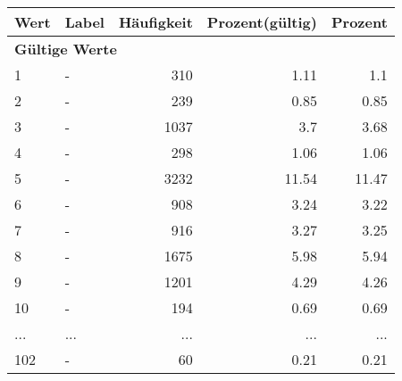      \begin{longtable}{lXrrr}
     \toprule
     \textbf{Wert} & \textbf{Label} & \textbf{Häufigkeit} & \textbf{Prozent(gültig)} & \textbf{Prozent} \\
     \endhead
     \midrule
     \multicolumn{5}{l}{\textbf{Gültige Werte}}\\
        1 & \multicolumn{1}{X}{-} & %
          \num{310} &
          \num[round-mode=places,round-precision=2]{1.11} &
          \num[round-mode=places,round-precision=2]{1.1} \\
        2 & \multicolumn{1}{X}{-} & %
          \num{239} &
          \num[round-mode=places,round-precision=2]{0.85} &
          \num[round-mode=places,round-precision=2]{0.85} \\
        3 & \multicolumn{1}{X}{-} & %
          \num{1037} &
          \num[round-mode=places,round-precision=2]{3.7} &
          \num[round-mode=places,round-precision=2]{3.68} \\
        4 & \multicolumn{1}{X}{-} & %
          \num{298} &
          \num[round-mode=places,round-precision=2]{1.06} &
          \num[round-mode=places,round-precision=2]{1.06} \\
        5 & \multicolumn{1}{X}{-} & %
          \num{3232} &
          \num[round-mode=places,round-precision=2]{11.54} &
          \num[round-mode=places,round-precision=2]{11.47} \\
        6 & \multicolumn{1}{X}{-} & %
          \num{908} &
          \num[round-mode=places,round-precision=2]{3.24} &
          \num[round-mode=places,round-precision=2]{3.22} \\
        7 & \multicolumn{1}{X}{-} & %
          \num{916} &
          \num[round-mode=places,round-precision=2]{3.27} &
          \num[round-mode=places,round-precision=2]{3.25} \\
        8 & \multicolumn{1}{X}{-} & %
          \num{1675} &
          \num[round-mode=places,round-precision=2]{5.98} &
          \num[round-mode=places,round-precision=2]{5.94} \\
        9 & \multicolumn{1}{X}{-} & %
          \num{1201} &
          \num[round-mode=places,round-precision=2]{4.29} &
          \num[round-mode=places,round-precision=2]{4.26} \\
        10 & \multicolumn{1}{X}{-} & %
          \num{194} &
          \num[round-mode=places,round-precision=2]{0.69} &
          \num[round-mode=places,round-precision=2]{0.69} \\
       ... & ... & ... & ... & ... \\
        102 & \multicolumn{1}{X}{-} & %
          \num{60} &
          \num[round-mode=places,round-precision=2]{0.21} &
          \num[round-mode=places,round-precision=2]{0.21} \\


\end{longtable}
